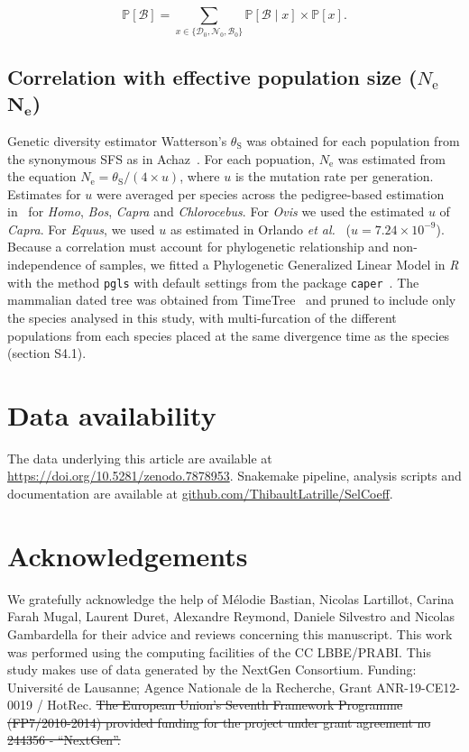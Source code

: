\documentclass[10pt,letterpaper]{article}
\newcommand{\Ne}{N_{\text{e}}}
\newcommand{\proba}{\mathbb{P}}
\newcommand{\SphyDel}{\mathcal{D}_0}
\newcommand{\SphyNeu}{\mathcal{N}_0}
\newcommand{\SphyBen}{\mathcal{B}_0}
\newcommand{\Sphyclass}{x}
\newcommand{\given}{\mid}
\newcommand{\SpopBen}{\mathcal{B}}
\newcommand{\thetaSyn}{\theta_{\text{S}}}
\providecommand{\DIFdeltex}[1]{{\protect\color{red}\sout{#1}}}                      %
\providecommand{\DIFaddbegin}{} %
\providecommand{\DIFaddend}{} %
\providecommand{\DIFdelbegin}{} %
\providecommand{\DIFdelend}{} %
\providecommand{\DIFdel}[1]{\texorpdfstring{\DIFdeltex{#1}}{}} %
\newcommand{\DIFscaledelfig}{0.5}
\newlength{\DIFdelgraphicswidth} %
\newlength{\DIFdelgraphicsheight} %
\newcommand{\DIFaddincludegraphics}[2][]{{\color{blue}\fbox{\DIFOincludegraphics[#1]{#2}}}} %
\newcommand{\DIFdelincludegraphics}[2][]{%
\sbox{\DIFdelgraphicsbox}{\DIFOincludegraphics[#1]{#2}}%
\settoboxwidth{\DIFdelgraphicswidth}{\DIFdelgraphicsbox} %
\settoboxtotalheight{\DIFdelgraphicsheight}{\DIFdelgraphicsbox} %
\scalebox{\DIFscaledelfig}{%
\parbox[b]{\DIFdelgraphicswidth}{\usebox{\DIFdelgraphicsbox}\\[-\baselineskip] \rule{\DIFdelgraphicswidth}{0em}}\llap{\resizebox{\DIFdelgraphicswidth}{\DIFdelgraphicsheight}{%
\setlength{\unitlength}{\DIFdelgraphicswidth}%
\begin{picture}(1,1)%
\thicklines\linethickness{2pt} %
{\color[rgb]{1,0,0}\put(0,0){\framebox(1,1){}}}%
{\color[rgb]{1,0,0}\put(0,0){\line( 1,1){1}}}%
{\color[rgb]{1,0,0}\put(0,1){\line(1,-1){1}}}%
\end{picture}%
}\hspace*{3pt}}} %
} %
\DeclareRobustCommand{\DIFaddbegin}{\DIFOaddbegin \let\includegraphics\DIFaddincludegraphics} %
\DeclareRobustCommand{\DIFaddend}{\DIFOaddend \let\includegraphics\DIFOincludegraphics} %
\DeclareRobustCommand{\DIFdelbegin}{\DIFOdelbegin \let\includegraphics\DIFdelincludegraphics} %
\DeclareRobustCommand{\DIFdelend}{\DIFOaddend \let\includegraphics\DIFOincludegraphics} %
\begin{document}
\begin{equation}
\proba [ \SpopBen ] = \sum_{\Sphyclass \in \{\SphyDel, \SphyNeu, \SphyBen \} }\proba [\SpopBen \given \Sphyclass ] \times \proba [\Sphyclass ].
\label{eq:total_proba}
\end{equation}

\subsection{Correlation with effective population size (\DIFdelbegin \DIFdel{$\Ne$}\DIFdelend \DIFaddbegin \texorpdfstring{$\bm{\Ne}$}{Nₑ}\DIFaddend )}
\label{subsec:correlation-diversity}
Genetic diversity estimator Watterson's $\thetaSyn$ was obtained for each population from the synonymous SFS as in Achaz~\cite{achaz_frequency_2009}.
For each popuation, $\Ne$ was estimated from the equation $\Ne=\thetaSyn / (4 \times u)$, where $u$ is the mutation rate per generation.
Estimates for $u$ were averaged per species across the pedigree-based estimation in~\cite{bergeron_evolution_2023} for \textit{Homo}, \textit{Bos}, \textit{Capra} and \textit{Chlorocebus}.
For \textit{Ovis} we used the estimated $u$ of \textit{Capra}.
For \textit{Equus}, we used $u$ as estimated in Orlando \textit{et al.}~\cite{orlando_recalibrating_2013} ($u=7.24\times10^{-9}$).
Because a correlation must account for phylogenetic relationship and non-independence of samples, we fitted a Phylogenetic Generalized Linear Model in \textit{R} with the method \texttt{pgls} with default settings from the package \texttt{caper}~\cite{orme_caper_2013}.
The mammalian dated tree was obtained from TimeTree~\cite{kumar_timetree_2017} and pruned to include only the species analysed in this study, with multi-furcation of the different populations from each species placed at the same divergence time as the species (section S4.1).

\section*{Data availability}
The data underlying this article are available at \url{https://doi.org/10.5281/zenodo.7878953}.
Snakemake pipeline, analysis scripts and documentation are available at \href{https://github.com/ThibaultLatrille/SelCoeff}{github.com/ThibaultLatrille/SelCoeff}.

\section*{Acknowledgements}
\label{sec:acknowledgment}
We gratefully acknowledge the help of Mélodie Bastian, Nicolas Lartillot, Carina Farah Mugal, Laurent Duret, Alexandre Reymond, Daniele Silvestro and Nicolas Gambardella for their advice and reviews concerning this manuscript.
This work was performed using the computing facilities of the CC LBBE/PRABI\@.
This study makes use of data generated by the NextGen Consortium.
Funding:
Université de Lausanne; Agence Nationale de la Recherche, Grant ANR-19-CE12-0019 / HotRec.
\DIFdelbegin \DIFdel{The European Union’s Seventh Framework Programme (FP7/2010-2014) provided funding for the project under grant agreement no 244356 - “NextGen”.
}\DIFdelend 
\end{document}
